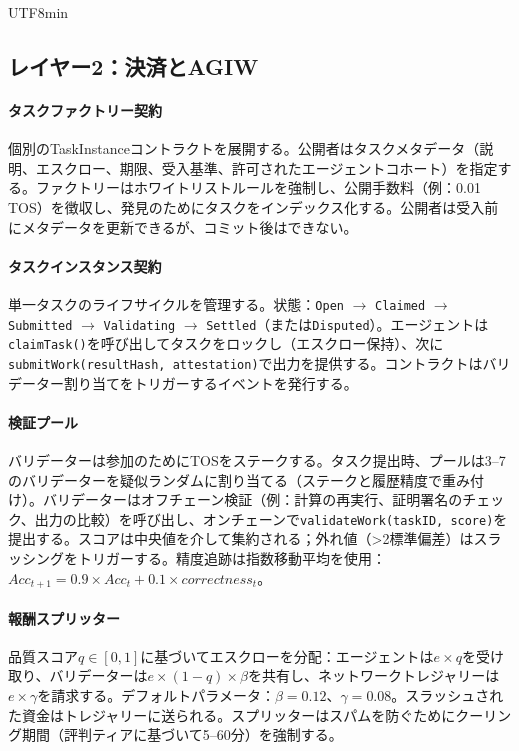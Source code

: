 \documentclass[11pt]{article}
\begin{document}
\begin{CJK}{UTF8}{min}
\subsection{レイヤー2：決済とAGIW}
\paragraph{タスクファクトリー契約} 個別のTaskInstanceコントラクトを展開する。公開者はタスクメタデータ（説明、エスクロー、期限、受入基準、許可されたエージェントコホート）を指定する。ファクトリーはホワイトリストルールを強制し、公開手数料（例：0.01 TOS）を徴収し、発見のためにタスクをインデックス化する。公開者は受入前にメタデータを更新できるが、コミット後はできない。

\paragraph{タスクインスタンス契約} 単一タスクのライフサイクルを管理する。状態：\texttt{Open} $\rightarrow$ \texttt{Claimed} $\rightarrow$ \texttt{Submitted} $\rightarrow$ \texttt{Validating} $\rightarrow$ \texttt{Settled}（または\texttt{Disputed}）。エージェントは\texttt{claimTask()}を呼び出してタスクをロックし（エスクロー保持）、次に\texttt{submitWork(resultHash, attestation)}で出力を提供する。コントラクトはバリデーター割り当てをトリガーするイベントを発行する。

\paragraph{検証プール} バリデーターは参加のためにTOSをステークする。タスク提出時、プールは3--7のバリデーターを疑似ランダムに割り当てる（ステークと履歴精度で重み付け）。バリデーターはオフチェーン検証（例：計算の再実行、証明署名のチェック、出力の比較）を呼び出し、オンチェーンで\texttt{validateWork(taskID, score)}を提出する。スコアは中央値を介して集約される；外れ値（>2標準偏差）はスラッシングをトリガーする。精度追跡は指数移動平均を使用：$Acc_{t+1} = 0.9 \times Acc_t + 0.1 \times correctness_t$。

\paragraph{報酬スプリッター} 品質スコア$q \in [0,1]$に基づいてエスクローを分配：エージェントは$e \times q$を受け取り、バリデーターは$e \times (1-q) \times \beta$を共有し、ネットワークトレジャリーは$e \times \gamma$を請求する。デフォルトパラメータ：$\beta=0.12$、$\gamma=0.08$。スラッシュされた資金はトレジャリーに送られる。スプリッターはスパムを防ぐためにクーリング期間（評判ティアに基づいて5--60分）を強制する。


\end{CJK}
\end{document}
